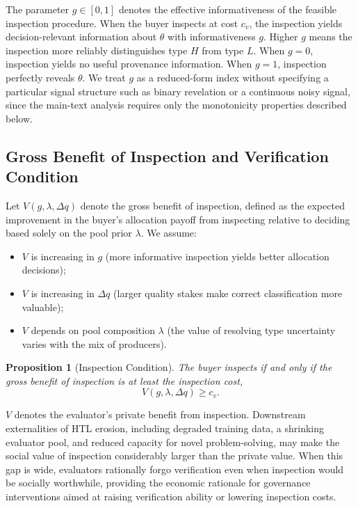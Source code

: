 \documentclass{article}
\theoremstyle{plain}
\newtheorem{proposition}[theorem]{Proposition}
\theoremstyle{definition}
\theoremstyle{remark}
\begin{document}
The parameter $g\in[0,1]$ denotes the effective informativeness of the feasible inspection procedure. When the buyer inspects at cost $c_v$, the inspection yields decision-relevant information about $\theta$ with informativeness $g$. Higher $g$ means the inspection more reliably distinguishes type $H$ from type $L$. When $g=0$, inspection yields no useful provenance information. When $g=1$, inspection perfectly reveals $\theta$. We treat $g$ as a reduced-form index without specifying a particular signal structure such as binary revelation or a continuous noisy signal, since the main-text analysis requires only the monotonicity properties described below.

\subsection{Gross Benefit of Inspection and Verification Condition}
\label{app:benefit}

Let $V(g,\lambda,\Delta q)$ denote the gross benefit of inspection, defined as the expected improvement in the buyer's allocation payoff from inspecting relative to deciding based solely on the pool prior $\lambda$. We assume:
\begin{itemize}
\item $V$ is increasing in $g$ (more informative inspection yields better allocation decisions);
\item $V$ is increasing in $\Delta q$ (larger quality stakes make correct classification more valuable);
\item $V$ depends on pool composition $\lambda$ (the value of resolving type uncertainty varies with the mix of producers).
\end{itemize}

\begin{proposition}[Inspection Condition]
\label{prop:inspect}
The buyer inspects if and only if the gross benefit of inspection is at least the inspection cost,
\begin{equation}
V(g, \lambda, \Delta q) \geq c_v.
\end{equation}
\end{proposition}

$V$ denotes the evaluator's private benefit from inspection. Downstream externalities of HTL erosion, including degraded training data, a shrinking evaluator pool, and reduced capacity for novel problem-solving, may make the social value of inspection considerably larger than the private value. When this gap is wide, evaluators rationally forgo verification even when inspection would be socially worthwhile, providing the economic rationale for governance interventions aimed at raising verification ability or lowering inspection costs.
\end{document}

